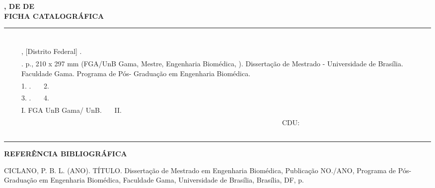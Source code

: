 \begin{fichacatalografica}
\begin{flushleft}
    \textbf{\imprimirlocal, \imprimirdia DE \imprimirmes DE \imprimirdata} \\
       	    \vspace{0.25 in}
	\textbf{FICHA CATALOGRÁFICA}\\
	\begin{tabular}{c|p{}p{13.5cm}|}
	\multicolumn{3}{l}{~~~ } \\ \cline{2-3} 
	& & \\
	& & \imprimirautor \\
	& & \imprimirtitulo, [Distrito Federal] \imprimirdata.\\
	& & \imprimirpublicacao. \pageref{LastPage} p., 210 x 297 mm (FGA/UnB Gama, Mestre, Engenharia Biomédica, \imprimirdata).
	Dissertação de Mestrado - Universidade de Brasília. 
	Faculdade Gama. Programa de Pós- Graduação em Engenharia Biomédica.\\
	& & 1. \imprimirpalavrachaveum. ~~~2. \imprimirpalavrachavedois \\
	& & 3. \imprimirpalavrachavetres. ~~~4. \imprimirpalavrachavequatro \\
	& & I. FGA UnB Gama/ UnB. ~~~II.\imprimirtitulo \\
	& & ~~~~~~~~~~~~~~~~~~~~~~~~~~~~~~~~~~~~~~~~~~~~~~~~~~~~~~~~~~~~~~~~~~~~~~~~~~~CDU: \nomecdu \\ \cline{2-3}
	\multicolumn{3}{l}{~~~ } \\
	\end{tabular}
\end{flushleft}
	
\end{fichacatalografica}


\begin{flushleft}
\textbf{REFERÊNCIA BIBLIOGRÁFICA}\\
\end{flushleft}
CICLANO, P. B. L. (ANO). TÍTULO. Dissertação de Mestrado em Engenharia
Biomédica, Publicação NO./ANO, Programa de Pós-Graduação em Engenharia
Biomédica, Faculdade Gama, Universidade de Brasília, Brasília, DF, \pageref{LastPage} p.

